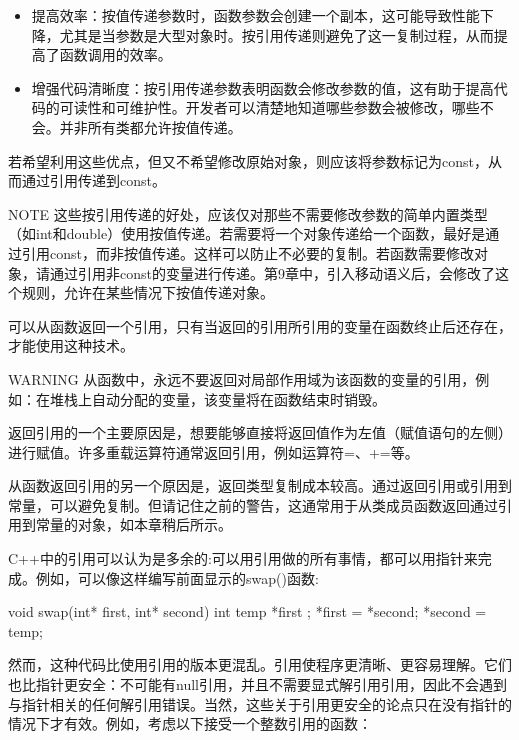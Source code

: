 \begin{itemize}
\item
提高效率：按值传递参数时，函数参数会创建一个副本，这可能导致性能下降，尤其是当参数是大型对象时。按引用传递则避免了这一复制过程，从而提高了函数调用的效率。

\item
增强代码清晰度：按引用传递参数表明函数会修改参数的值，这有助于提高代码的可读性和可维护性。开发者可以清楚地知道哪些参数会被修改，哪些不会。并非所有类都允许按值传递。
\end{itemize}

若希望利用这些优点，但又不希望修改原始对象，则应该将参数标记为const，从而通过引用传递到const。

\begin{myNotic}{NOTE}
这些按引用传递的好处，应该仅对那些不需要修改参数的简单内置类型（如int和double）使用按值传递。若需要将一个对象传递给一个函数，最好是通过引用const，而非按值传递。这样可以防止不必要的复制。若函数需要修改对象，请通过引用非const的变量进行传递。第9章中，引入移动语义后，会修改了这个规则，允许在某些情况下按值传递对象。
\end{myNotic}


可以从函数返回一个引用，只有当返回的引用所引用的变量在函数终止后还存在，才能使用这种技术。

\begin{myWarning}{WARNING}
从函数中，永远不要返回对局部作用域为该函数的变量的引用，例如：在堆栈上自动分配的变量，该变量将在函数结束时销毁。
\end{myWarning}

返回引用的一个主要原因是，想要能够直接将返回值作为左值（赋值语句的左侧）进行赋值。许多重载运算符通常返回引用，例如运算符=、+=等。

从函数返回引用的另一个原因是，返回类型复制成本较高。通过返回引用或引用到常量，可以避免复制。但请记住之前的警告，这通常用于从类成员函数返回通过引用到常量的对象，如本章稍后所示。


C++中的引用可以认为是多余的:可以用引用做的所有事情，都可以用指针来完成。例如，可以像这样编写前面显示的swap()函数:

\begin{cpp}
void swap(int* first, int* second)
{
    int temp { *first };
    *first = *second;
    *second = temp;
}
\end{cpp}

然而，这种代码比使用引用的版本更混乱。引用使程序更清晰、更容易理解。它们也比指针更安全：不可能有null引用，并且不需要显式解引用引用，因此不会遇到与指针相关的任何解引用错误。当然，这些关于引用更安全的论点只在没有指针的情况下才有效。例如，考虑以下接受一个整数引用的函数：

